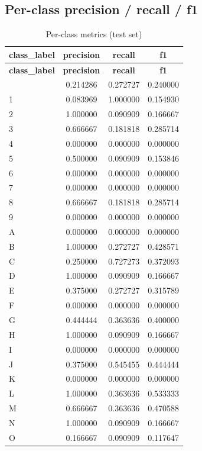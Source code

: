 \documentclass[11pt,a4paper]{article}
\begin{document}
\subsection{Per-class precision / recall / f1}
\small
\begin{longtable}{@{}l c c c@{}}
\caption{Per-class metrics (test set)}\\
\toprule
\textbf{class\_label} & \textbf{precision} & \textbf{recall} & \textbf{f1} \\
\midrule
\endfirsthead
\toprule
\textbf{class\_label} & \textbf{precision} & \textbf{recall} & \textbf{f1} \\
\midrule
\endhead
\bottomrule
\endfoot
0  & 0.214286 & 0.272727 & 0.240000 \\
1  & 0.083969 & 1.000000 & 0.154930 \\
2  & 1.000000 & 0.090909 & 0.166667 \\
3  & 0.666667 & 0.181818 & 0.285714 \\
4  & 0.000000 & 0.000000 & 0.000000 \\
5  & 0.500000 & 0.090909 & 0.153846 \\
6  & 0.000000 & 0.000000 & 0.000000 \\
7  & 0.000000 & 0.000000 & 0.000000 \\
8  & 0.666667 & 0.181818 & 0.285714 \\
9  & 0.000000 & 0.000000 & 0.000000 \\
A  & 0.000000 & 0.000000 & 0.000000 \\
B  & 1.000000 & 0.272727 & 0.428571 \\
C  & 0.250000 & 0.727273 & 0.372093 \\
D  & 1.000000 & 0.090909 & 0.166667 \\
E  & 0.375000 & 0.272727 & 0.315789 \\
F  & 0.000000 & 0.000000 & 0.000000 \\
G  & 0.444444 & 0.363636 & 0.400000 \\
H  & 1.000000 & 0.090909 & 0.166667 \\
I  & 0.000000 & 0.000000 & 0.000000 \\
J  & 0.375000 & 0.545455 & 0.444444 \\
K  & 0.000000 & 0.000000 & 0.000000 \\
L  & 1.000000 & 0.363636 & 0.533333 \\
M  & 0.666667 & 0.363636 & 0.470588 \\
N  & 1.000000 & 0.090909 & 0.166667 \\
O  & 0.166667 & 0.090909 & 0.117647 \\

\end{longtable}
\end{document}
